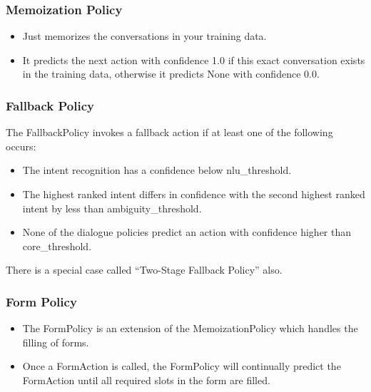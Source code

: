  \begin{frame}[fragile]\frametitle{Memoization Policy}
\begin{itemize}
\item Just memorizes the conversations in your training data. 
\item It predicts the next action with confidence 1.0 if this exact conversation exists in the training data, otherwise it predicts None with confidence 0.0.
\end{itemize}
\end{frame}

 \begin{frame}[fragile]\frametitle{Fallback Policy}
 The FallbackPolicy invokes a fallback action if at least one of the following occurs:
\begin{itemize}
\item The intent recognition has a confidence below nlu\_threshold.
\item The highest ranked intent differs in confidence with the second highest ranked intent by less than ambiguity\_threshold.
\item None of the dialogue policies predict an action with confidence higher than core\_threshold.
\end{itemize}

There is a special case called ``Two-Stage Fallback Policy'' also.
\end{frame}

 \begin{frame}[fragile]\frametitle{Form Policy}
\begin{itemize}
\item The FormPolicy is an extension of the MemoizationPolicy which handles the filling of forms. 
\item Once a FormAction is called, the FormPolicy will continually predict the FormAction until all required slots in the form are filled. 
\end{itemize}
\end{frame}